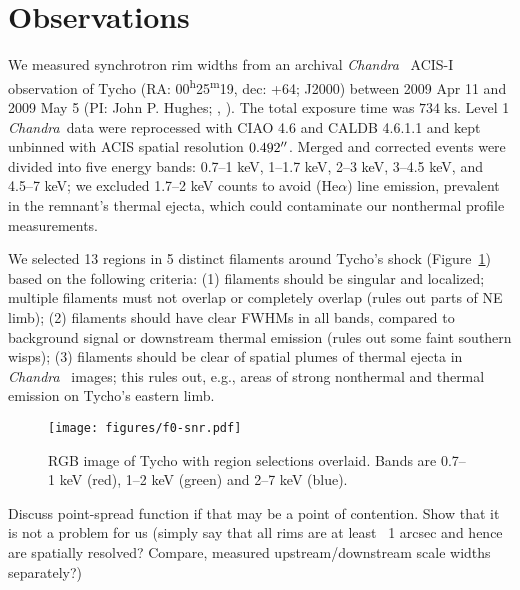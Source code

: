 \documentclass[iop, apj, numberedappendix, twocolappendix]{emulateapj}
\newcommand{\mt}{\mathrm}
\newcommand{\unit}[1]{\;\mt{#1}}  %
\newcommand{\tsup}{\textsuperscript}
\newcommand{\Chandra}{\textit{Chandra}\ }
\begin{document}
\section{Observations}

We measured synchrotron rim widths from an archival \Chandra
ACIS-I observation of Tycho
(RA: 00\tsup{h}25\tsup{m}19, dec: +64; J2000)
between 2009 Apr 11 and 2009 May 5 (PI: John P. Hughes;
,
).
The total exposure time was $734 \unit{ks}$.
Level 1 \Chandra data were reprocessed with CIAO 4.6 and CALDB 4.6.1.1 and kept
unbinned with ACIS spatial resolution $0.492\mbox{$^{\prime\prime}$}$.
Merged and corrected events were divided into five energy bands:
0.7--1 keV, 1--1.7 keV, 2--3 keV, 3--4.5 keV, and 4.5--7 keV;
we excluded 1.7--2 keV counts to avoid  (He$\alpha$) line
emission, prevalent in the remnant's thermal ejecta, which could contaminate
our nonthermal profile measurements.

We selected 13 regions in 5 distinct filaments around Tycho's shock
(Figure~\ref{fig:snr}) based on the following criteria:
(1) filaments should be singular and localized; multiple filaments must not
overlap or completely overlap (rules out parts of NE limb);
(2) filaments should have clear FWHMs in all bands, compared to background
signal or downstream thermal emission (rules out some faint southern wisps);
(3) filaments should be clear of spatial plumes of thermal ejecta in \Chandra
images; this rules out, e.g., areas of strong nonthermal and thermal emission
on Tycho's eastern limb.

\begin{figure}
    \centering
    \texttt{[image: figures/f0-snr.pdf]}
    \caption{RGB image of Tycho with region selections overlaid.  Bands are
    0.7--1 keV (red), 1--2 keV (green) and 2--7 keV (blue).
    }
    \label{fig:snr}
\end{figure}

Discuss point-spread function if that may be a point of contention.
Show that it is not a problem for us (simply say that all rims are at
least ~1 arcsec and hence are spatially resolved? Compare,
\citet{bamba2005-hist} measured upstream/downstream scale widths separately?)
\end{document}
